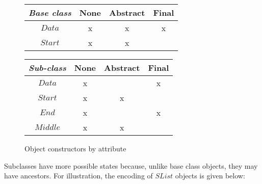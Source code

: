 \documentclass[runningheads,a4paper]{llncs}
\begin{document}
\begin{figure}
\begin{center}
\begin{tabular}{|c|c|c|c|}
\hline \emph{Base class} & None & Abstract & Final \\ 
\hline $\mathit{Data}$         & x & x & x \\ 
\hline $\mathit{Start}$     & x & x & \\
\hline
\end{tabular} 
\begin{tabular}{|c|c|c|c|}
\hline \emph{Sub-class} & None & Abstract & Final \\ 
\hline $\mathit{Data}$         & x &   & x \\ 
\hline $\mathit{Start}$     & x & x &   \\ 
\hline $\mathit{End}$     & x &   & x \\ 
\hline $\mathit{Middle}$ & x & x &   \\ 
\hline 
\end{tabular} 
\end{center}
\caption{Object constructors by attribute}
\label{tab:baseconstructors}
\end{figure}

Subclasses have more possible states because, unlike base class objects, they may have ancestors. For illustration, the encoding of $\mathit{SList}$ objects is given below:
\end{document}
